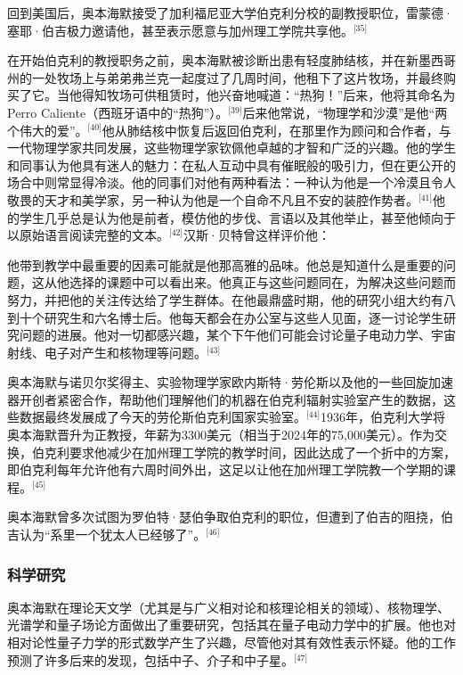 回到美国后，奥本海默接受了加利福尼亚大学伯克利分校的副教授职位，雷蒙德·塞耶·伯吉极力邀请他，甚至表示愿意与加州理工学院共享他。\(^\text{[35]}\)

在开始伯克利的教授职务之前，奥本海默被诊断出患有轻度肺结核，并在新墨西哥州的一处牧场上与弟弟弗兰克一起度过了几周时间，他租下了这片牧场，并最终购买了它。当他得知牧场可供租赁时，他兴奋地喊道：“热狗！”后来，他将其命名为Perro Caliente（西班牙语中的“热狗”）。\(^\text{[39]}\)后来他常说，“物理学和沙漠”是他“两个伟大的爱”。\(^\text{[40]}\)他从肺结核中恢复后返回伯克利，在那里作为顾问和合作者，与一代物理学家共同发展，这些物理学家钦佩他卓越的才智和广泛的兴趣。他的学生和同事认为他具有迷人的魅力：在私人互动中具有催眠般的吸引力，但在更公开的场合中则常显得冷淡。他的同事们对他有两种看法：一种认为他是一个冷漠且令人敬畏的天才和美学家，另一种认为他是一个自命不凡且不安的装腔作势者。\(^\text{[41]}\)他的学生几乎总是认为他是前者，模仿他的步伐、言语以及其他举止，甚至他倾向于以原始语言阅读完整的文本。\(^\text{[42]}\)汉斯·贝特曾这样评价他：

他带到教学中最重要的因素可能就是他那高雅的品味。他总是知道什么是重要的问题，这从他选择的课题中可以看出来。他真正与这些问题同在，为解决这些问题而努力，并把他的关注传达给了学生群体。在他最鼎盛时期，他的研究小组大约有八到十个研究生和六名博士后。他每天都会在办公室与这些人见面，逐一讨论学生研究问题的进展。他对一切都感兴趣，某个下午他们可能会讨论量子电动力学、宇宙射线、电子对产生和核物理等问题。\(^\text{[43]}\)

奥本海默与诺贝尔奖得主、实验物理学家欧内斯特·劳伦斯以及他的一些回旋加速器开创者紧密合作，帮助他们理解他们的机器在伯克利辐射实验室产生的数据，这些数据最终发展成了今天的劳伦斯伯克利国家实验室。\(^\text{[44]}\)1936年，伯克利大学将奥本海默晋升为正教授，年薪为3300美元（相当于2024年的75,000美元）。作为交换，伯克利要求他减少在加州理工学院的教学时间，因此达成了一个折中的方案，即伯克利每年允许他有六周时间外出，这足以让他在加州理工学院教一个学期的课程。\(^\text{[45]}\)

奥本海默曾多次试图为罗伯特·瑟伯争取伯克利的职位，但遭到了伯吉的阻挠，伯吉认为“系里一个犹太人已经够了”。\(^\text{[46]}\)
\subsubsection{科学研究}
奥本海默在理论天文学（尤其是与广义相对论和核理论相关的领域）、核物理学、光谱学和量子场论方面做出了重要研究，包括其在量子电动力学中的扩展。他也对相对论性量子力学的形式数学产生了兴趣，尽管他对其有效性表示怀疑。他的工作预测了许多后来的发现，包括中子、介子和中子星。\(^\text{[47]}\)

